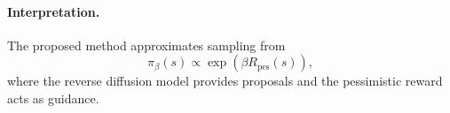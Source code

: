 \documentclass[11pt]{article}
\begin{document}
\paragraph{Interpretation.}
The proposed method approximates sampling from
\begin{equation*}
\pi_\beta(s) \propto \exp(\beta R_{\mathrm{pes}}(s)),
\end{equation*}
where the reverse diffusion model provides proposals and the pessimistic reward acts as guidance.



\end{document}
